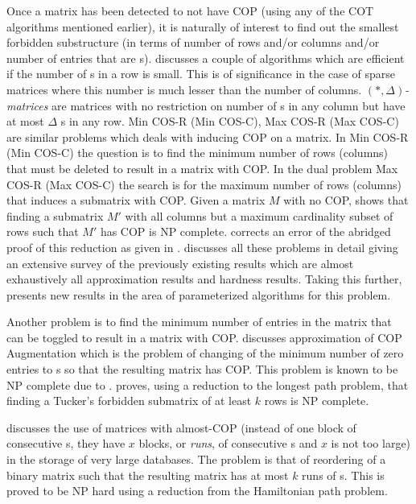 Once a matrix has been detected to not have COP (using any of the COT
algorithms mentioned earlier), it is naturally of interest to find out
the smallest forbidden substructure (in terms of number of rows and/or
columns and/or number of entries that are {\un}s). \cite{d08phd}
discusses a couple of algorithms which are efficient if the number of
{\un}s in a row is small. This is of significance in the case of
sparse matrices where this number is much lesser than the number of
columns. $(*,\Delta)${\em -matrices} are matrices with no restriction
on number of {\un}s in any column but have at most $\Delta$ {\un}s in
any row. {\sc Min COS-R (Min COS-C), Max COS-R (Max COS-C)} are
similar problems which deals with inducing COP on a matrix. In {\sc
  Min COS-R (Min COS-C)} the question is to find the minimum number of
rows (columns) that must be deleted to result in a matrix with COP.
In the dual problem {\sc Max COS-R (Max COS-C)} the search is for the
maximum number of rows (columns) that induces a submatrix with
COP. Given a matrix $M$ with no COP, \cite{b75-phd} shows that finding
a submatrix $M'$ with all columns but a maximum cardinality
subset of rows such that $M'$ has COP is NP complete. \cite{hg02}
corrects an error of the abridged proof of this reduction as given in
\cite{gj79}.  \cite{d08phd} discusses all these problems in detail
giving an extensive survey of the previously existing results which
are almost exhaustively all approximation results and hardness
results. Taking this further, \cite{d08phd} presents new results in
the area of parameterized algorithms for this
problem.

Another problem is to find the minimum number of entries in the matrix
that can be toggled to result in a matrix with COP.  \cite{v85}
discusses approximation of {\sc COP Augmentation} which is the problem
of changing of the minimum number of zero entries to {\un}s so that
the resulting matrix has COP. This problem is known to be NP complete
due to \cite{b75-phd}. \cite{v82} proves, using a reduction to the
longest path problem, that finding a Tucker's forbidden submatrix of
at least $k$ rows is NP complete.

\cite{jkckv04} discusses the use of matrices with almost-COP (instead
of one block of consecutive {\un}s, they have $x$ blocks, or {\em
  runs}, of consecutive {\un}s and $x$ is not too large) in the
storage of very large databases.  The problem is that of reordering of
a binary matrix such that the resulting matrix has at most $k$ runs of
{\un}s. This is proved to be NP hard using a reduction from the
Hamiltonian path problem.



